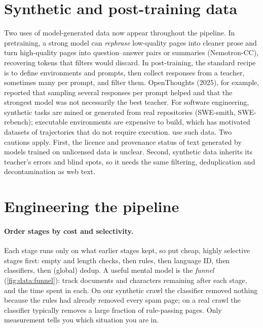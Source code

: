 \section{Synthetic and post-training data}\label{sec:data:synthetic}

Two uses of model-generated data now appear throughout the pipeline. In pretraining, a strong
model can \emph{rephrase} low-quality pages into cleaner prose and turn high-quality pages into
question--answer pairs or summaries (Nemotron-CC), recovering tokens that filters would discard. In
post-training, the standard recipe is to define environments and prompts, then collect responses
from a teacher, sometimes many per prompt, and filter them. OpenThoughts (2025), for example, reported
that sampling several responses per prompt helped and that the strongest model was not
necessarily the best teacher. For software engineering, synthetic tasks are mined or generated from
real repositories (SWE-smith, SWE-rebench); executable environments are expensive to build, which
has motivated datasets of trajectories that do not require execution. 
use such data. Two cautions apply. First, the licence and provenance status of text generated by
models trained on unlicensed data is unclear. Second, synthetic data inherits its teacher's errors and
blind spots, so it needs the same filtering, deduplication and decontamination as web text.

\section{Engineering the pipeline}\label{sec:data:engineering}

\paragraph{Order stages by cost and selectivity.} Each stage runs only on what earlier stages
kept, so put cheap, highly selective stages first: empty and length checks, then rules, then
language ID, then classifiers, then (global) dedup. A useful mental model is the
\emph{funnel} (\cref{fig:data:funnel}): track documents and characters remaining after each stage,
and the time spent in each. On our synthetic crawl the classifier removed nothing because the rules
had already removed every spam page; on a real crawl the classifier typically removes a large
fraction of rule-passing pages. Only measurement tells you which situation you are in.

